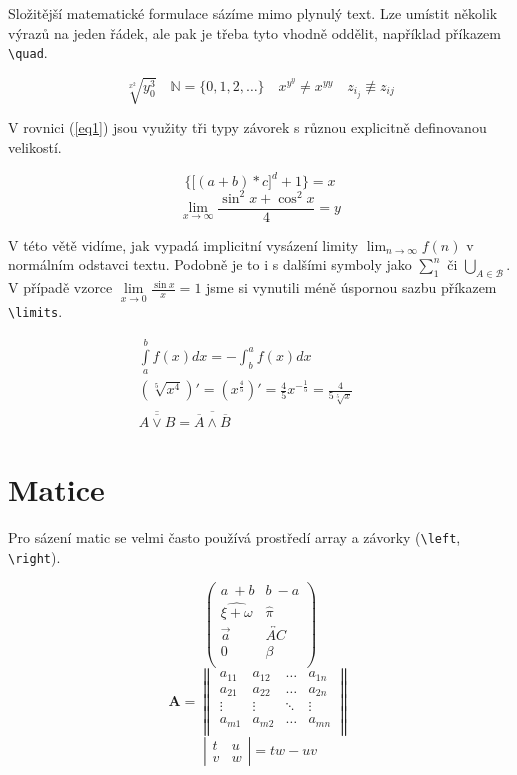 \documentclass[a4paper,11pt,twocolumn]{article}
\theoremstyle{definition}
\theoremstyle{plain}
\begin{document}
Složitější matematické formulace sázíme mimo plynulý text. Lze umístit několik výrazů na jeden řádek, ale pak je třeba tyto vhodně oddělit, například příkazem \verb|\quad|. 

$$\sqrt[x^2]{y_0^3}\quad \mathbb{N}=\{0,1,2,\ldots\}\quad x^{y^y} \neq x^{yy}\quad z_{i_j}\not\equiv z_{ij}$$\quad

V rovnici (\ref{eq1}) jsou využity tři typy závorek s různou explicitně definovanou velikostí.

\begin{equation}\label{eq1}
\bigg\{\bigg[(a+b)*c\bigg]^d+1\bigg\}=x
\end{equation}
\begin{equation*}
\lim \limits_{x \to \infty}\frac{\sin^2 x + \cos^2 x}{4}=y
\end{equation*}

V této větě vidíme, jak vypadá implicitní vysázení limity $\lim_{n \to \infty}f(n)$ v normálním odstavci textu. Podobně je to i s dalšími symboly jako $\sum_1^n$ či $\bigcup_{A\in \mathcal{B}}$. V případě vzorce $\lim \limits_{x \to 0}\frac{\sin x}{x}=1$ jsme si vynutili méně úspornou sazbu příkazem \verb|\limits|.

\begin{eqnarray}
&\int\limits_a^b f(x)dx = -\int_b^a f(x)dx& \\
&\left(\sqrt[5]{x^4}\right)' = \left(x^\frac{4}{5}\right)' = \frac{4}{5}x^{-\frac{1}{5}} = \frac{4}{5\sqrt[5]{x}}& \\
&\overline{\overline{{A}\lor{B}}} = \overline{\overline{A}\land\overline{B}}&\qquad
\end{eqnarray}

\section{Matice}

Pro sázení matic se velmi často používá prostředí array a závorky (\verb|\left|, \verb|\right|). 

$$ \left( \begin{array}{cc}
  a~+ b & b~- a \\
  \widehat{\xi+\omega} & \hat{\pi} \\
  \vec{a} & \overleftrightarrow{AC} \\
  0 & {\beta} \\
\end{array} \right) $$
$$ \mathbf{A} = \left \| \begin{array}{cccc}
   a_{11} & a_{12} & \ldots & a_{1n} \\
   a_{21} & a_{22} & \ldots & a_{2n} \\
   \vdots & \vdots & \ddots & \vdots \\
   a_{m1} & a_{m2} & \ldots & a_{mn} \\
 \end{array} \right \| $$
$$ \left| \begin{array}{ll}
  t~& u\\
  v & w \end{array} \right | = tw - uv
$$\quad
\end{document}
